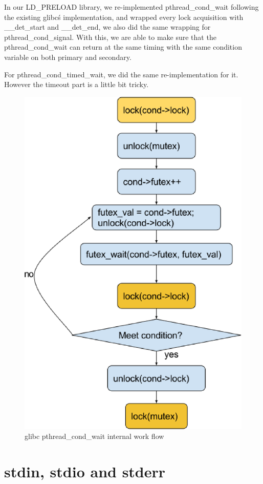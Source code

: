 \newpage

In our LD\_PRELOAD library, we re-implemented pthread\_cond\_wait following the existing glibc\'s implementation, and wrapped every lock acquisition with \_\_det\_start and \_\_det\_end, we also did the same wrapping for pthread\_cond\_signal. With this, we are able to make sure that the pthread\_cond\_wait can return at the same timing with the same condition variable on both primary and secondary.

For pthread\_cond\_timed\_wait, we did the same re-implementation for it. However the timeout part is a little bit tricky. %

\begin{figure}
\centering
\includegraphics[width=0.4\columnwidth]{figures/cond_wait}
\caption{glibc pthread\_cond\_wait internal work flow}
\label{f:cond_wait}
\end{figure}

\section{stdin, stdio and stderr} \label{chap:stdxxx}

